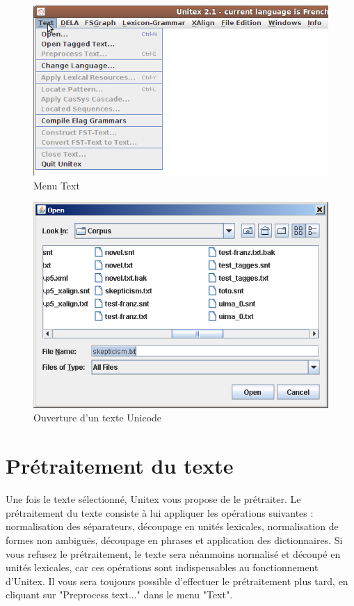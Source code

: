 \begin{figure}[!h]
\begin{center}
\includegraphics[width=14cm]{resources/img/fig2-7.png}
\caption{Menu Text}
\end{center}
\end{figure}

\begin{figure}[!h]
\begin{center}
\includegraphics[width=13cm]{resources/img/fig2-8.png}
\caption{Ouverture d’un texte Unicode}
\end{center}
\end{figure}



\section{Prétraitement du texte}
\noindent Une fois le texte sélectionné, Unitex vous propose de le prétraiter. Le prétraitement du
texte consiste à lui appliquer les opérations suivantes : normalisation des séparateurs, 
découpage en unités lexicales, normalisation de formes non ambiguës, découpage en phrases
et application des dictionnaires. Si vous refusez le prétraitement, le texte sera néanmoins
normalisé et découpé en unités lexicales, car ces opérations sont indispensables au
fonctionnement d’Unitex. Il vous sera toujours possible d’effectuer le prétraitement plus tard,
en cliquant sur "Preprocess text..." dans le menu "Text".


